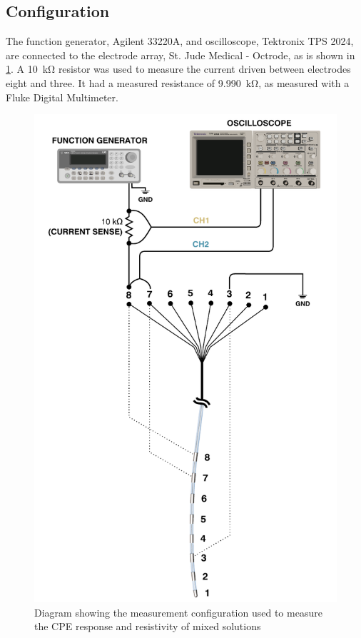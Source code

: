 \subsection{Configuration}

The function generator, Agilent 33220A, and oscilloscope, Tektronix TPS 2024, are connected to the electrode array, St. Jude Medical - Octrode, as is shown in \cref{fig:creatingCSF_setup}.
A \SI{10}{\kilo\ohm} resistor was used to measure the current driven between electrodes eight and three.
It had a measured resistance of \SI{9.990}{\kilo\ohm}, as measured with a Fluke Digital Multimeter.

\begin{figure}
    \centering
    \includegraphics[scale=0.95]{content/pt2/graphics/CreatingCSF_setup}
    \caption{\label{fig:creatingCSF_setup}Diagram showing the measurement configuration used to measure the CPE response and resistivity of mixed solutions}
\end{figure}

